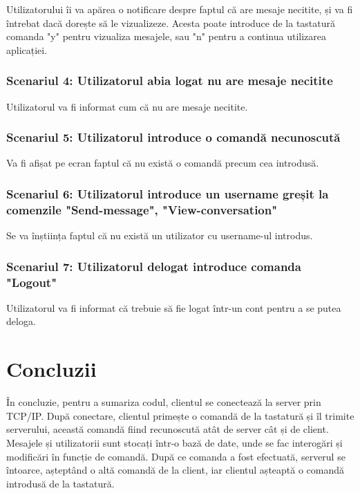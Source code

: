 \documentclass[a4paper,12pt]{article}
\begin{document}
\tab
Utilizatorului îi va apărea o notificare despre faptul că are mesaje necitite, și va fi întrebat dacă dorește să le vizualizeze. Acesta poate introduce de la tastatură comanda "y" pentru vizualiza mesajele, sau "n" pentru a continua utilizarea aplicației.

\subsubsection {Scenariul 4: Utilizatorul abia logat nu are mesaje necitite}

\tab
Utilizatorul va fi informat cum că nu are mesaje necitite.

\subsubsection {Scenariul 5: Utilizatorul introduce o comandă necunoscută}

\tab
Va fi afișat pe ecran faptul că nu există o comandă precum cea introdusă.

\subsubsection {Scenariul 6: Utilizatorul introduce un username greșit la comenzile "Send-message", "View-conversation"}

\tab
Se va înștiința faptul că nu există un utilizator cu username-ul introdus.

\subsubsection {Scenariul 7: Utilizatorul delogat introduce comanda "Logout"}

\tab
Utilizatorul va fi informat că trebuie să fie logat într-un cont pentru a se putea deloga.

\section {Concluzii}

\tab
În concluzie, pentru a sumariza codul, clientul se conectează la server prin TCP/IP. După conectare, clientul primește o comandă de la tastatură și îl trimite serverului, această comandă fiind recunoscută atât de server cât și de client. Mesajele și utilizatorii sunt stocați într-o bază de date, unde se fac interogări și modificări în funcție de comandă. După ce comanda a fost efectuată, serverul se întoarce, așteptând o altă comandă de la client, iar clientul așteaptă o comandă introdusă de la tastatură.\newpage
\end{document}

